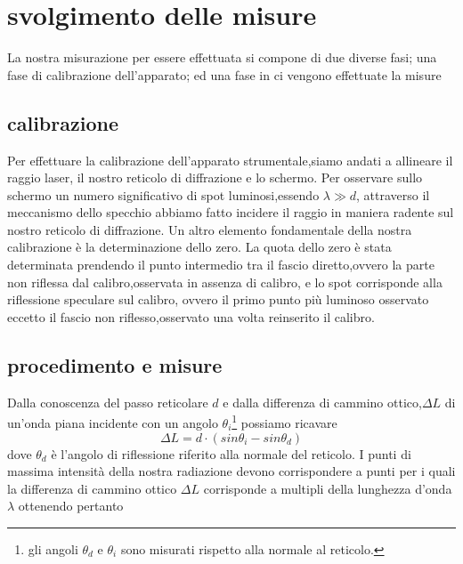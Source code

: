 \section{svolgimento delle misure}
La nostra misurazione per essere effettuata si compone di due diverse fasi; una fase di 
calibrazione
dell'apparato; ed una fase in ci vengono 
effettuate la misure 
\subsection{calibrazione }
Per effettuare la calibrazione dell'apparato 
strumentale,siamo andati  a allineare il raggio laser,
il nostro reticolo di diffrazione e lo schermo.
Per osservare sullo schermo un numero
significativo di spot luminosi,essendo $\lambda \gg d$,
attraverso il meccanismo dello specchio abbiamo 
fatto incidere il raggio in maniera radente sul 
nostro reticolo di diffrazione.
Un altro elemento fondamentale della nostra 
calibrazione è la determinazione dello
zero.
La quota dello zero è stata determinata
prendendo il punto intermedio tra il fascio 
diretto,ovvero la parte non riflessa dal calibro,osservata 
in assenza di calibro,
e lo spot corrisponde alla riflessione
speculare sul calibro, ovvero il primo punto più luminoso
osservato eccetto il fascio non riflesso,osservato una
volta reinserito il calibro.
\subsection{procedimento e misure}
Dalla conoscenza del passo reticolare $d$ e
dalla  differenza di cammino ottico,$\Delta L$
di un'onda piana incidente con un angolo $\theta_i$\footnote{gli angoli $\theta_d$ e $\theta_i$ sono misurati rispetto alla normale al reticolo.}
possiamo ricavare 
\smallskip
\begin{equation}\label{eq:delta L}
\Delta L = d \cdot (sin \theta_i - sin \theta_d)
\end{equation}
\smallskip
dove $\theta_d$ è l'angolo di riflessione 
riferito alla normale del reticolo.
I punti di massima intensità della nostra radiazione 
devono corrispondere a punti per i quali 
la differenza di cammino ottico 
$\Delta L$ corrisponde a multipli della 
lunghezza d'onda $\lambda$
ottenendo pertanto 
\smallskip

